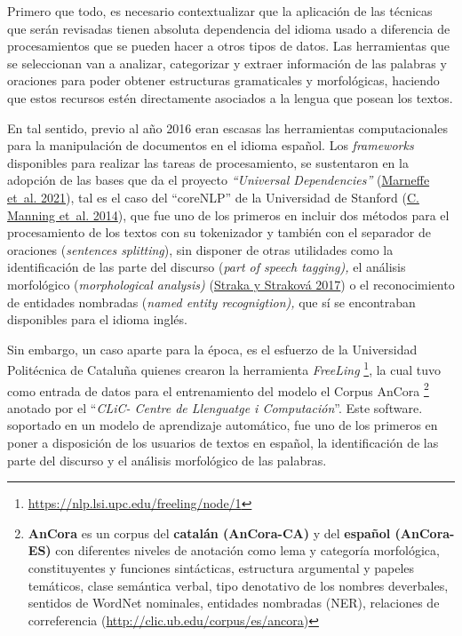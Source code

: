 \documentclass[
  12pt,
  openany]{book}
\begin{document}
Primero que todo, es necesario contextualizar que la aplicación de las técnicas que serán revisadas tienen absoluta dependencia del idioma usado a diferencia de procesamientos que se pueden hacer a otros tipos de datos. Las herramientas que se seleccionan van a analizar, categorizar y extraer información de las palabras y oraciones para poder obtener estructuras gramaticales y morfológicas, haciendo que estos recursos estén directamente asociados a la lengua que posean los textos.

En tal sentido, previo al año 2016 eran escasas las herramientas computacionales para la manipulación de documentos en el idioma español. Los \emph{frameworks} disponibles para realizar las tareas de procesamiento, se sustentaron en la adopción de las bases que da el proyecto \emph{``Universal Dependencies''} (\protect\hyperlink{ref-demarneffe2021}{Marneffe et~al. 2021}), tal es el caso del ``coreNLP'' de la Universidad de Stanford (\protect\hyperlink{ref-manning-etal-2014-stanford}{C. Manning et~al. 2014}), que fue uno de los primeros en incluir dos métodos para el procesamiento de los textos con su tokenizador y también con el separador de oraciones (\emph{sentences splitting}), sin disponer de otras utilidades como la identificación de las parte del discurso (\emph{part of speech tagging),} el análisis morfológico (\emph{morphological analysis)} (\protect\hyperlink{ref-straka2017}{Straka y Straková 2017}) o el reconocimiento de entidades nombradas (\emph{named entity recognigtion),} que sí se encontraban disponibles para el idioma inglés.

Sin embargo, un caso aparte para la época, es el esfuerzo de la Universidad Politécnica de Cataluña quienes crearon la herramienta \emph{FreeLing} \footnote{\url{https://nlp.lsi.upc.edu/freeling/node/1}}, la cual tuvo como entrada de datos para el entrenamiento del modelo el Corpus AnCora \footnote{\textbf{AnCora} es un corpus del \textbf{catalán (AnCora-CA)} y del \textbf{español (AnCora-ES)} con diferentes niveles de anotación como lema y categoría morfológica, constituyentes y funciones sintácticas, estructura argumental y papeles temáticos, clase semántica verbal, tipo denotativo de los nombres deverbales, sentidos de WordNet nominales, entidades nombradas (NER), relaciones de correferencia (\url{http://clic.ub.edu/corpus/es/ancora})} anotado por el ``\emph{CLiC- Centre de Llenguatge i Computación}''. Este software. soportado en un modelo de aprendizaje automático, fue uno de los primeros en poner a disposición de los usuarios de textos en español, la identificación de las parte del discurso y el análisis morfológico de las palabras.
\end{document}
